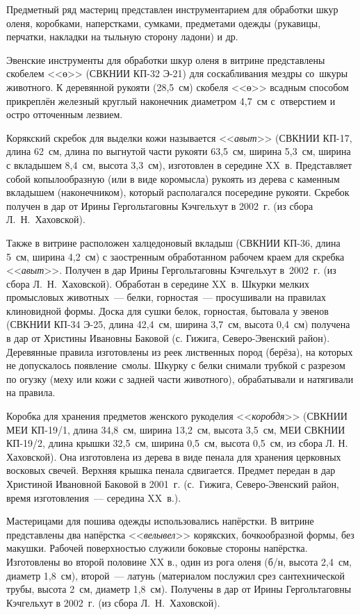 Предметный ряд мастериц представлен инструментарием для обработки шкур оленя, коробками, наперстками, сумками, предметами одежды (рукавицы, перчатки, накладки на тыльную сторону ладони) и др.

Эвенские инструменты для обработки шкур оленя в витрине представлены скобелем <<ө>> (СВКНИИ КП-32 Э-21) для соскабливания мездры со~шкуры животного. К деревянной рукояти (28,5~см) скобеля <<ө>> всадным способом прикреплён железный круглый наконечник диаметром 4,7~см с~отверстием и остро отточенным лезвием.

Корякский скребок для выделки кожи называется <<\textit{авыт}>> (СВКНИИ КП-17, длина 62~см, длина по выгнутой части рукояти 63,5~см, ширина 5,3~см, ширина с вкладышем 8,4~см, высота 3,3~см), изготовлен в середине XX~в. Представляет собой копылообразную (или в виде коромысла) рукоять из дерева с каменным вкладышем (наконечником), который располагался посередине рукояти. Скребок получен в дар от Ирины Гергольтаговны Кэчгельхут в 2002~г. (из сбора Л.~Н.~Хаховской).

Также в витрине расположен халцедоновый вкладыш (СВКНИИ КП-36, длина 5~см, ширина 4,2~см) с заостренным обработанном рабочем краем для скребка <<\textit{авыт}>>. Получен в дар Ирины Гергольтаговны Кэчгельхут в~2002~г. (из сбора Л.~Н.~Хаховской). Обработан в середине XX~в.
\clearpage
Шкурки мелких промысловых животных~--- белки, горностая~--- просушивали на правилах клиновидной формы. Доска для сушки белок, горностая, бытовала у эвенов (СВКНИИ КП-34 Э-25, длина 42,4~см, ширина 3,7~см, высота 0,4~см) получена в дар от Христины Ивановны Баковой (с. Гижига, Северо-Эвенский район). Деревянные правила изготовлены из реек лиственных пород (берёза), на которых не допускалось появление~смолы. Шкурку с белки снимали трубкой с разрезом по огузку (меху или кожи с задней части животного), обрабатывали и натягивали на правила.

Коробка для хранения предметов женского рукоделия <<\textit{коробдя}>> (СВКНИИ МЕИ КП-19/1, длина 34,8~см, ширина 13,2~см, высота 3,5~см, МЕИ СВКНИИ КП-19/2, длина крышки 32,5~см, ширина 0,5~см, высота 0,5~см, из сбора Л. Н. Хаховской). Она изготовлена из дерева в виде пенала для хранения церковных восковых свечей. Верхняя крышка пенала сдвигается. Предмет передан в дар Христиной Ивановной Баковой в 2001~г. (с.~Гижига, Северо-Эвенский район, время изготовления~--- середина XX~в.).

Мастерицами для пошива одежды использовались напёрстки. В витрине представлены два напёрстка <<\textit{велывел}>> корякских, бочкообразной формы, без макушки. Рабочей поверхностью служили боковые стороны напёрстка. Изготовлены во второй половине XX в., один из рога оленя (б/н, высота 2,4~см, диаметр 1,8~см), второй~--- латунь (материалом послужил срез сантехнической трубы, высота 2~см, диаметр 1,8~см). Получены в дар от Ирины Гергольтаговны Кэчгельхут в 2002~г. (из сбора Л.~Н.~Хаховской).

